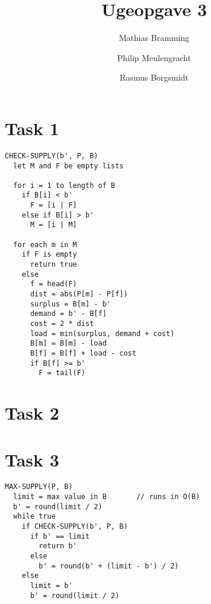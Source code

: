 \documentclass[paper=a4, fleqn]{article}
\title{Ugeopgave 3}
\author{Mathias Bramming \and Philip Meulengracht \and Rasmus Borgsmidt}
\date{}
\begin{document}
\maketitle
\section*{Task 1}

\begin{lstlisting}
CHECK-SUPPLY(b', P, B)
  let M and F be empty lists

  for i = 1 to length of B
    if B[i] < b'
      F = [i | F]
    else if B[i] > b'
      M = [i | M]

  for each m in M
    if F is empty
      return true
    else
      f = head(F)
      dist = abs(P[m] - P[f])
      surplus = B[m] - b'
      demand = b' - B[f]
      cost = 2 * dist
      load = min(surplus, demand + cost)
      B[m] = B[m] - load
      B[f] = B[f] + load - cost
      if B[f] >= b'
        F = tail(F)
\end{lstlisting}

\section*{Task 2}

\clearpage
\section*{Task 3}

\begin{lstlisting}
MAX-SUPPLY(P, B)
  limit = max value in B       // runs in O(B)
  b' = round(limit / 2)
  while true
    if CHECK-SUPPLY(b', P, B)
      if b' == limit
        return b'
      else
        b' = round(b' + (limit - b') / 2)
    else
      limit = b'
      b' = round(limit / 2)
\end{lstlisting}
\end{document}
